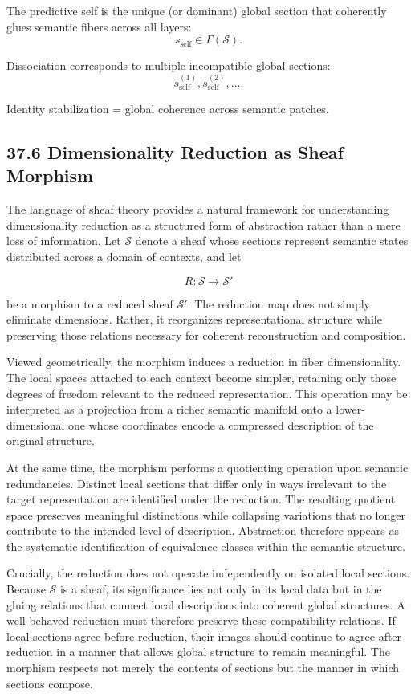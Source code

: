 \documentclass[12pt,letterpaper]{article}
\theoremstyle{remark}
\begin{document}
The predictive self is the unique (or dominant) global section that coherently glues semantic fibers across all layers:
\[
s_{\text{self}} \in \Gamma(\mathcal{S}).
\]

Dissociation corresponds to multiple incompatible global sections:
\[
s_{\text{self}}^{(1)}, s_{\text{self}}^{(2)}, \dots.
\]

Identity stabilization = global coherence across semantic patches.

\subsection{37.6 Dimensionality Reduction as Sheaf Morphism}

The language of sheaf theory provides a natural framework for understanding dimensionality reduction as a structured form of abstraction rather than a mere loss of information. Let $\mathcal{S}$ denote a sheaf whose sections represent semantic states distributed across a domain of contexts, and let

\[
R : \mathcal{S} \to \mathcal{S}'
\]

be a morphism to a reduced sheaf $\mathcal{S}'$. The reduction map does not simply eliminate dimensions. Rather, it reorganizes representational structure while preserving those relations necessary for coherent reconstruction and composition.

Viewed geometrically, the morphism induces a reduction in fiber dimensionality. The local spaces attached to each context become simpler, retaining only those degrees of freedom relevant to the reduced representation. This operation may be interpreted as a projection from a richer semantic manifold onto a lower-dimensional one whose coordinates encode a compressed description of the original structure.

At the same time, the morphism performs a quotienting operation upon semantic redundancies. Distinct local sections that differ only in ways irrelevant to the target representation are identified under the reduction. The resulting quotient space preserves meaningful distinctions while collapsing variations that no longer contribute to the intended level of description. Abstraction therefore appears as the systematic identification of equivalence classes within the semantic structure.

Crucially, the reduction does not operate independently on isolated local sections. Because $\mathcal{S}$ is a sheaf, its significance lies not only in its local data but in the gluing relations that connect local descriptions into coherent global structures. A well-behaved reduction must therefore preserve these compatibility relations. If local sections agree before reduction, their images should continue to agree after reduction in a manner that allows global structure to remain meaningful. The morphism respects not merely the contents of sections but the manner in which sections compose.
\end{document}
